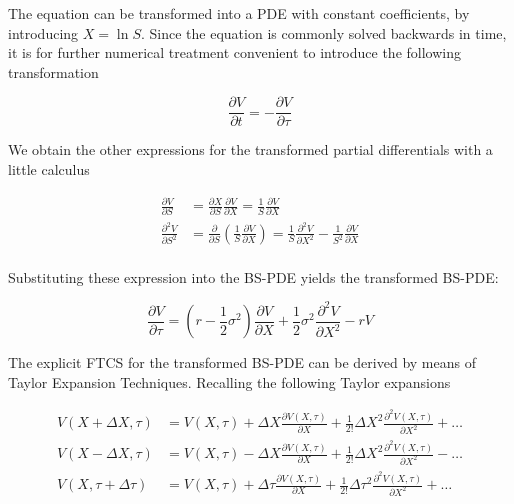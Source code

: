 \documentclass[11pt,a4paper]{article}
\begin{document}
The equation can be transformed into a PDE with constant coefficients, by introducing $X=\ln S$. Since the equation is commonly solved backwards in time, it is for further numerical treatment convenient to introduce the following transformation

\begin{equation*}
\frac{\partial V}{\partial t}=-\frac{\partial V}{\partial \tau}
\end{equation*}

We obtain the other expressions for the transformed partial differentials with a little calculus

\begin{align*}
\frac{\partial V}{\partial S}&=\frac{\partial X}{\partial S}\frac{\partial V}{\partial X}=\frac{1}{S}\frac{\partial V}{\partial X}\\
\frac{\partial^2 V}{\partial S^2}&=\frac{\partial}{\partial S}\left(\frac{1}{S}\frac{\partial V}{\partial X}\right)=\frac{1}{S}\frac{\partial^2 V}{\partial X^2}-\frac{1}{S^2}\frac{\partial V}{\partial X}\\
\end{align*}

Substituting these expression into the BS-PDE yields the transformed BS-PDE:

\begin{equation}
\frac{\partial V}{\partial \tau}=\left(r-\frac{1}{2}\sigma^2\right)\frac{\partial V}{\partial X}+\frac{1}{2}\sigma^2\frac{\partial^2V}{\partial X^2}-rV
\label{eq:transformed-BS-PDE}
\end{equation}

The explicit FTCS for the transformed BS-PDE can be derived by means of Taylor Expansion Techniques. Recalling the following Taylor expansions 

\begin{align}
V(X+\Delta X,\tau)&=V(X,\tau)+\Delta X\frac{\partial V(X,\tau)}{\partial X}+\frac{1}{2!}\Delta X^2 \frac{\partial^2 V(X,\tau)}{\partial X^2}+\ldots \label{eq:TaylorminDeltaX}\\
V(X-\Delta X,\tau)&=V(X,\tau)-\Delta X\frac{\partial V(X,\tau)}{\partial X}+\frac{1}{2!}\Delta X^2 \frac{\partial^2 V(X,\tau)}{\partial X^2}-\ldots \label{eq:TaylorDeltaX} \\
V(X,\tau+\Delta \tau)&=V(X,\tau)+\Delta \tau \frac{\partial V(X,\tau)}{\partial X}+\frac{1}{2!}\Delta \tau^2 \frac{\partial^2 V(X,\tau)}{\partial X^2}+\ldots \label{eq:TaylorDeltaTau}
\end{align}
\end{document}
